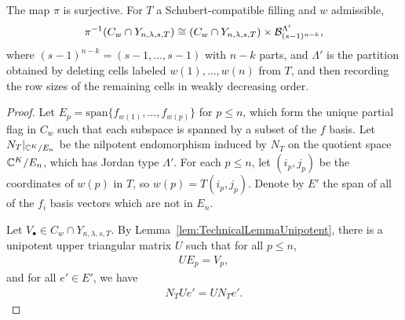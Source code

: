 \documentclass[12pt]{amsart}
\newcommand{\vspan}{\mathrm{span}}
\newcommand{\la}{\lambda}
\begin{document}
\begin{lemma}\label{lem:FiberBundle}
The map $\pi$ is surjective. For $T$ a Schubert-compatible filling and $w$ admissible,
\begin{align}\label{eq:FiberBundleIso}
\pi^{-1}(C_{w}\cap Y_{n,\la,s,T}) \cong (C_{w}\cap Y_{n,\la,s,T})\times \cB_{(s-1)^{n-k}}^{\Lambda'},
\end{align}
where $(s-1)^{n-k} = (s-1,\dots, s-1)$ with $n-k$ parts, and $\Lambda'$ is the partition obtained by deleting cells labeled $w(1),\dots, w(n)$ from $T$, and then recording the row sizes of the remaining cells in weakly decreasing order.
\end{lemma}
\begin{proof}
Let  $E_p = \vspan\{f_{w(1)},\dots, f_{w(p)}\}$ for $p\leq n$, which form the unique partial flag in $C_w$ such that each subspace is spanned by a subset of the $f$ basis. Let $N_T|_{\mathbb{C}^K/E_n}$ be the nilpotent endomorphism induced by $N_T$ on the quotient space $\mathbb{C}^K/E_n$, which has Jordan type $\Lambda'$.
 For each $p\leq n$, let $(i_p,j_p)$ be the coordinates of $w(p)$ in $T$, so $w(p) = T(i_p,j_p)$. Denote by $E'$ the span of all of the $f_{i}$ basis vectors which are not in $E_n$.
 
 Let $V_\bullet\in C_w\cap Y_{n,\la,s,T}$. By Lemma~\ref{lem:TechnicalLemmaUnipotent}, there is a unipotent upper triangular matrix $U$ such that for all $p\leq n$,
\begin{align}
U E_p = V_p,
\end{align}
and for all $e'\in E'$, we have 
\begin{align}\label{eq:Commutativity}
N_TU e' = UN_T e'.
\end{align}


\end{proof}
\end{document}
